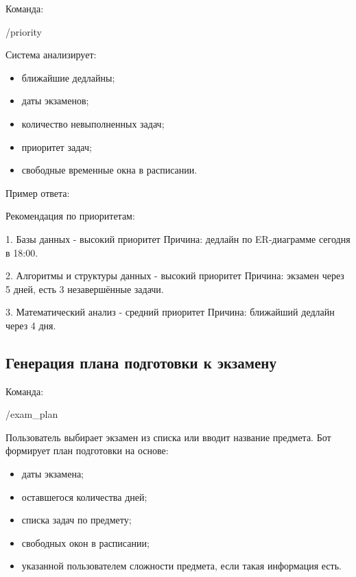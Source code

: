 \documentclass[10pt,a4paper,final]{article} %
\begin{document}
Команда:

\begin{Code}
/priority
\end{Code}

Система анализирует:

\begin{itemize}
    \item ближайшие дедлайны;
    \item даты экзаменов;
    \item количество невыполненных задач;
    \item приоритет задач;
    \item свободные временные окна в расписании.
\end{itemize}

Пример ответа:

\begin{Code}
Рекомендация по приоритетам:

1. Базы данных - высокий приоритет
Причина: дедлайн по ER-диаграмме сегодня в 18:00.

2. Алгоритмы и структуры данных - высокий приоритет
Причина: экзамен через 5 дней, есть 3 незавершённые задачи.

3. Математический анализ - средний приоритет
Причина: ближайший дедлайн через 4 дня.
\end{Code}

\subsection{Генерация плана подготовки к экзамену}

Команда:

\begin{Code}
/exam_plan
\end{Code}

Пользователь выбирает экзамен из списка или вводит название предмета. Бот формирует план подготовки на основе:

\begin{itemize}
    \item даты экзамена;
    \item оставшегося количества дней;
    \item списка задач по предмету;
    \item свободных окон в расписании;
    \item указанной пользователем сложности предмета, если такая информация есть.
\end{itemize}
\end{document}
